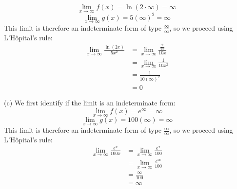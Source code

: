 \documentclass[11pt]{scrartcl}
\begin{document}
$$\lim_{x \to \infty}f(x)=\ln (2 \cdot \infty)=\infty$$
$$\lim_{x \to \infty}g(x)=5(\infty)^2=\infty$$
\noindent 
This limit is therefore an indeterminate form of type $\frac{\infty}{\infty}$, so we proceed using L'Hôpital's rule: 
\begin{align*}
\lim_{x \to \infty}\frac{\ln (2x)}{5x^2} &= \lim_{x \to \infty}\frac{\frac{2}{2x}}{10x} \\
                                         &=          \lim_{x \to \infty}\frac{1}{10x^2} \\
                                         &=      \frac{1}{10(\infty)^2} \\
                                         &=0
\end{align*}

\noindent 
(c) We first identify if the limit is an indeterminate form: 
$$\lim_{x \to \infty}f(x)=e^\infty=\infty$$
$$\lim_{x \to \infty}g(x)=100(\infty)=\infty$$
\noindent 
This limit is therefore an indeterminate form of type $\frac{\infty}{\infty}$, so we proceed using L'Hôpital's rule:
\begin{align*}
\lim_{x \to \infty} \frac{e^x}{100x} &= \lim_{x \to \infty}{\frac{e^x}{100}} \\
                                     &=\lim_{x \to \infty}{\frac{e^{\infty}}{100}} \\
                                     &=  \frac{\infty}{100} \\
                                     &=\infty
\end{align*}
\end{document}
